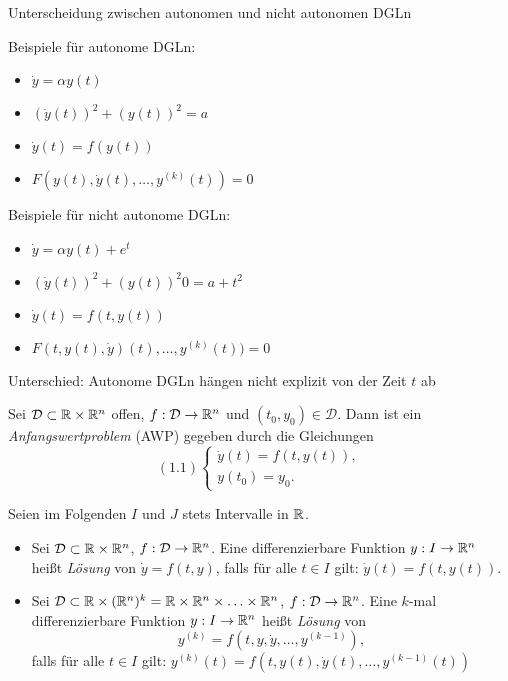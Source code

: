 \documentclass{cheat-sheet}
\newcommand{\D}{\mathcal{D}}
\begin{document}
Unterscheidung zwischen autonomen und nicht autonomen DGLn

Beispiele für autonome DGLn:
\begin{itemize}
  \item $\dot{y} = \alpha y(t)$
  \item $(\dot{y}(t))^2 + (y(t))^2 = a$
  \item $\dot{y}(t) = f(y(t))$
  \item $F(y(t), \dot{y}(t), \ldots, y^{(k)}(t)) = 0$
\end{itemize}

Beispiele für nicht autonome DGLn:
\begin{itemize}
  \item $\dot{y} = \alpha y(t) + e^{t}$
  \item $(\dot{y}(t))^2 + (y(t))^2 0= a + t^2$
  \item $\dot{y}(t) = f(t, y(t))$
  \item $F(t, y(t), \dot{y})(t), \ldots, y^{(k)}(t)) = 0$
\end{itemize}

Unterschied: Autonome DGLn hängen nicht explizit von der Zeit $t$ ab
\fi

\begin{defn}
  Sei $\D \subset \R \times \R^n$ offen, $f : \D \to \R^n$ und $(t_0, y_0) \in \D$. Dann ist ein \emph{Anfangswertproblem} (AWP) gegeben durch die Gleichungen
  \[
    (1.1) \left\{ \begin{array}{ll}
      \dot{y}(t) = f(t, y(t)), \\
      y(t_0) = y_0.
    \end{array} \right.
  \]
\end{defn}

\begin{nota}
  Seien im Folgenden $I$ und $J$ stets Intervalle in $\mathbb{R}$.
\end{nota}

\begin{defn}
  \begin{itemize}
    \item Sei $\D \subset \R \times \R^n$, $f : \D \to \R^n$. Eine differenzierbare Funktion $y : I \to \mathbb{R}^n$ heißt \emph{Lösung} von $\dot{y} = f(t, y)$, falls für alle $t \in I$ gilt: $\dot{y}(t) = f(t, y(t))$.
    \item Sei $\D \subset \R \times (\R^n)^k = \R \times \R^n \times \ldots \times \R^n$, $f : \D \to \R^n$. Eine $k$-mal differenzierbare Funktion $y : I \to \mathbb{R}^n$ heißt \emph{Lösung} von
    \[ y^{(k)} = f(t, y, \dot{y}, \ldots, y^{(k-1)}), \tag{1.2} \]
    falls für alle $t \in I$ gilt:
    $y^{(k)}(t) = f(t, y(t), \dot{y}(t), \ldots, y^{(k-1)}(t))$
  \end{itemize}
\end{defn}
\end{document}
